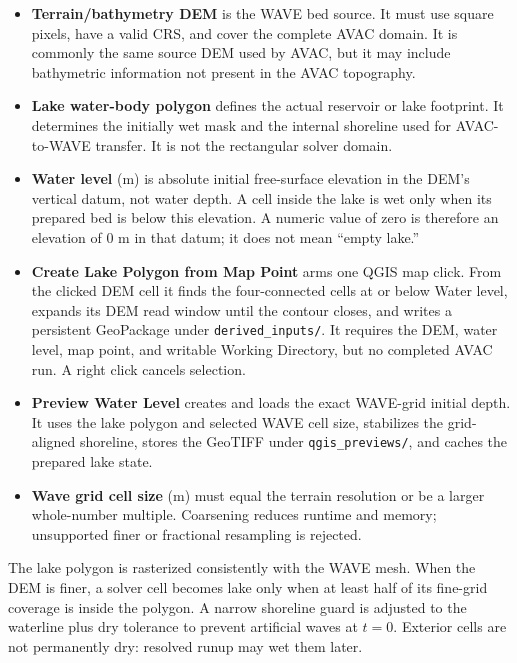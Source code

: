 \documentclass[11pt,a4paper]{article}
\newcommand{\control}[1]{\textbf{#1}}
\newcommand{\pathcode}[1]{\texttt{#1}}
\begin{document}
\begin{itemize}
  \item \control{Terrain/bathymetry DEM} is the WAVE bed source. It must use
        square pixels, have a valid CRS, and cover the complete AVAC domain.
        It is commonly the same source DEM used by AVAC, but it may include
        bathymetric information not present in the AVAC topography.
  \item \control{Lake water-body polygon} defines the actual reservoir or lake
        footprint. It determines the initially wet mask and the internal
        shoreline used for AVAC-to-WAVE transfer. It is not the rectangular
        solver domain.
  \item \control{Water level} (m) is absolute initial free-surface elevation in
        the DEM's vertical datum, not water depth. A cell inside the lake is wet
        only when its prepared bed is below this elevation. A numeric value of
        zero is therefore an elevation of 0 m in that datum; it does not mean
        ``empty lake.''
  \item \control{Create Lake Polygon from Map Point} arms one QGIS map click.
        From the clicked DEM cell it finds the four-connected cells at or below
        Water level, expands its DEM read window until the contour closes, and
        writes a persistent GeoPackage under \pathcode{derived\_inputs/}. It
        requires the DEM, water level, map point, and writable Working
        Directory, but no completed AVAC run. A right click cancels selection.
  \item \control{Preview Water Level} creates and loads the exact WAVE-grid
        initial depth. It uses the lake polygon and selected WAVE cell size,
        stabilizes the grid-aligned shoreline, stores the GeoTIFF under
        \pathcode{qgis\_previews/}, and caches the prepared lake state.
  \item \control{Wave grid cell size} (m) must equal the terrain resolution or
        be a larger whole-number multiple. Coarsening reduces runtime and
        memory; unsupported finer or fractional resampling is rejected.
\end{itemize}

The lake polygon is rasterized consistently with the WAVE mesh. When the DEM
is finer, a solver cell becomes lake only when at least half of its fine-grid
coverage is inside the polygon. A narrow shoreline guard is adjusted to the
waterline plus dry tolerance to prevent artificial waves at $t=0$. Exterior
cells are not permanently dry: resolved runup may wet them later.
\end{document}
